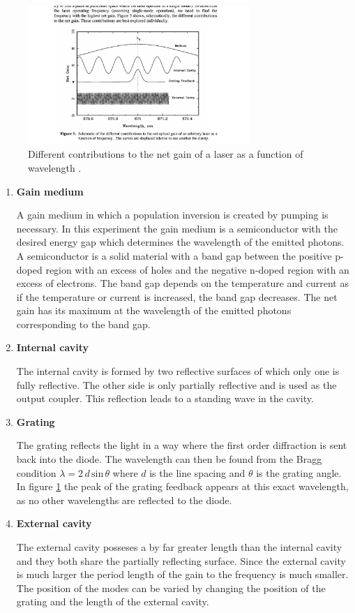 \begin{figure}
  \centering
  \includegraphics[width=0.75\textwidth]{net_gain.pdf}
  \caption{Different contributions to the net gain of a laser as a function of wavelength \cite{V60}.}
  \label{fig:netgain}
\end{figure}

\begin{enumerate}
\item \textbf{Gain medium}

\noindent
A gain medium in which a population inversion is created by pumping is necessary.
In this experiment the gain medium is a semiconductor with the desired energy gap which determines the wavelength of the emitted photons.
A semiconductor is a solid material with a band gap between the positive p-doped region with an excess of holes and the negative n-doped region with an excess of electrons.
The band gap depends on the temperature and current as if the temperature or current is increased, the band gap decreases.
The net gain has its maximum at the wavelength of the emitted photons corresponding to the band gap.

\item \textbf{Internal cavity}

\noindent
The internal cavity is formed by two reflective surfaces of which only one is fully reflective.
The other side is only partially reflective and is used as the output coupler.
This reflection leads to a standing wave in the cavity.

\item \textbf{Grating}

\noindent
The grating reflects the light in a way where the first order diffraction is sent back into the diode.
The wavelength can then be found from the Bragg condition $\lambda = 2 \, d \, \text{sin}\, \theta$ where $d$ is the line spacing and $\theta$ is the grating angle.
In figure \ref{fig:netgain} the peak of the grating feedback appears at this exact wavelength, as no other wavelengths are reflected to the diode.

\item \textbf{External cavity}

\noindent
The external cavity posseses a by far greater length than the internal cavity and they both share the partially reflecting surface.
Since the external cavity is much larger the period length of the gain to the frequency is much smaller.
The position of the modes can be varied by changing the position of the grating and the length of the external cavity.

\end{enumerate}

